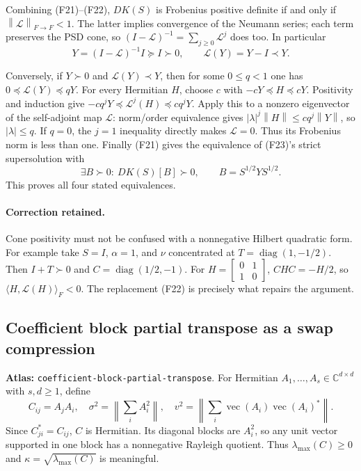 \documentclass[11pt,a4paper]{article}
\newcommand{\C}{\mathbb C}
\newcommand{\norm}[1]{\left\lVert#1\right\rVert}
\DeclareMathOperator{\diag}{diag}
\DeclareRobustCommand{\code}[1]{{\footnotesize\urlstyle{tt}\nolinkurl{#1}}}
\begin{document}
Combining (F21)--(F22), $DK(S)$ is Frobenius positive definite if and only
if $\norm{\mathcal L}_{F\to F}<1$. The latter implies convergence of the
Neumann series; each term preserves the PSD cone, so
$(I-\mathcal L)^{-1}=\sum_{j\ge0}\mathcal L^j$ does too. In particular
\[
 Y=(I-\mathcal L)^{-1}I\succeq I\succ0,
 \qquad\mathcal L(Y)=Y-I\prec Y.                            \tag{F23}
\]

Conversely, if $Y\succ0$ and $\mathcal L(Y)\prec Y$, then for some
$0\le q<1$ one has $0\preceq\mathcal L(Y)\preceq qY$.
For every Hermitian $H$, choose $c$ with $-cY\preceq H\preceq cY$.
Positivity and induction give
$-cq^jY\preceq\mathcal L^j(H)\preceq cq^jY$.
Apply this to a nonzero eigenvector of the self-adjoint map $\mathcal L$:
norm/order equivalence gives $|\lambda|^j\norm H\le cq^j\norm Y$,
so $|\lambda|\le q$. If $q=0$, the $j=1$ inequality directly makes
$\mathcal L=0$. Thus its Frobenius norm is less than one.
Finally (F21) gives the equivalence of (F23)'s strict supersolution with
\[
 \exists B\succ0:\ DK(S)[B]\succ0,
 \qquad B=S^{1/2}YS^{1/2}.
\]
This proves all four stated equivalences.

\paragraph{Correction retained.}
Cone positivity must not be confused with a nonnegative Hilbert quadratic
form. For example take $S=I$, $\alpha=1$, and $\nu$ concentrated at
$T=\diag(1,-1/2)$. Then $I+T\succ0$ and
$C=\diag(1/2,-1)$. For
$H=\left[\begin{smallmatrix}0&1\\1&0\end{smallmatrix}\right]$,
$CHC=-H/2$, so $\langle H,\mathcal L(H)\rangle_F<0$.
The replacement (F22) is precisely what repairs the argument.

\subsection{Coefficient block partial transpose as a swap compression}
\label{sec:coefficient-block-partial-transpose}
\textbf{Atlas:} \code{coefficient-block-partial-transpose}.
For Hermitian $A_1,\ldots,A_s\in\C^{d\times d}$ with $s,d\ge1$, define
\[
 C_{ij}=A_jA_i,\quad \sigma^2=\left\|\sum_iA_i^2\right\|,
 \quad v^2=\left\|\sum_i\operatorname{vec}(A_i)
                 \operatorname{vec}(A_i)^*\right\|.
\]
Since $C_{ji}^*=C_{ij}$, $C$ is Hermitian. Its diagonal blocks are $A_i^2$,
so any unit vector supported in one block has a nonnegative Rayleigh
quotient. Thus $\lambda_{\max}(C)\ge0$ and
$\kappa=\sqrt{\lambda_{\max}(C)}$ is meaningful.
\end{document}
